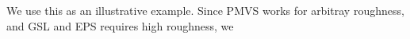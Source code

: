 We use this as an illustrative example. Since PMVS works for arbitray roughness, and GSL and EPS requires high roughness, we

